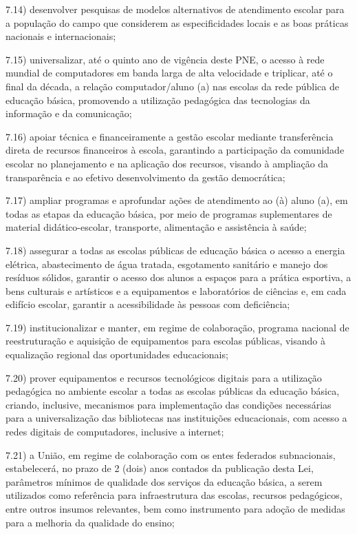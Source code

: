 \documentclass[
]{book}
\begin{document}
7.14) desenvolver pesquisas de modelos alternativos de atendimento escolar para a população do campo que considerem as especificidades locais e as boas práticas nacionais e internacionais;

7.15) universalizar, até o quinto ano de vigência deste PNE, o acesso à rede mundial de computadores em banda larga de alta velocidade e triplicar, até o final da década, a relação computador/aluno (a) nas escolas da rede pública de educação básica, promovendo a utilização pedagógica das tecnologias da informação e da comunicação;

7.16) apoiar técnica e financeiramente a gestão escolar mediante transferência direta de recursos financeiros à escola, garantindo a participação da comunidade escolar no planejamento e na aplicação dos recursos, visando à ampliação da transparência e ao efetivo desenvolvimento da gestão democrática;

7.17) ampliar programas e aprofundar ações de atendimento ao (à) aluno (a), em todas as etapas da educação básica, por meio de programas suplementares de material didático-escolar, transporte, alimentação e assistência à saúde;

7.18) assegurar a todas as escolas públicas de educação básica o acesso a energia elétrica, abastecimento de água tratada, esgotamento sanitário e manejo dos resíduos sólidos, garantir o acesso dos alunos a espaços para a prática esportiva, a bens culturais e artísticos e a equipamentos e laboratórios de ciências e, em cada edifício escolar, garantir a acessibilidade às pessoas com deficiência;

7.19) institucionalizar e manter, em regime de colaboração, programa nacional de reestruturação e aquisição de equipamentos para escolas públicas, visando à equalização regional das oportunidades educacionais;

7.20) prover equipamentos e recursos tecnológicos digitais para a utilização pedagógica no ambiente escolar a todas as escolas públicas da educação básica, criando, inclusive, mecanismos para implementação das condições necessárias para a universalização das bibliotecas nas instituições educacionais, com acesso a redes digitais de computadores, inclusive a internet;

7.21) a União, em regime de colaboração com os entes federados subnacionais, estabelecerá, no prazo de 2 (dois) anos contados da publicação desta Lei, parâmetros mínimos de qualidade dos serviços da educação básica, a serem utilizados como referência para infraestrutura das escolas, recursos pedagógicos, entre outros insumos relevantes, bem como instrumento para adoção de medidas para a melhoria da qualidade do ensino;
\end{document}
